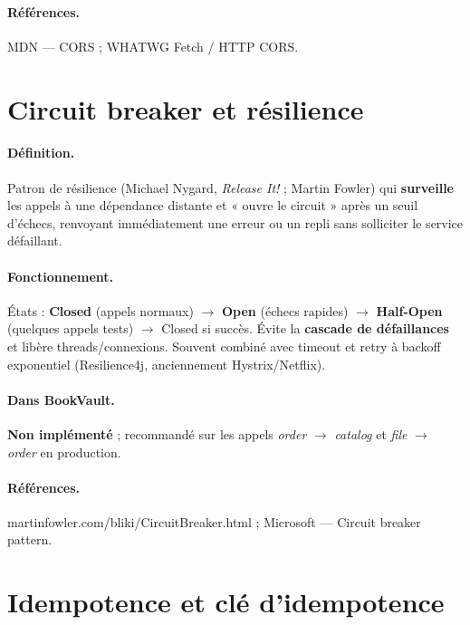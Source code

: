 \documentclass[12pt,a4paper]{report}
\begin{document}
\paragraph{Références.} MDN — CORS ; WHATWG Fetch / HTTP CORS.\par


\section{Circuit breaker et résilience}

\paragraph{Définition.} Patron de résilience (Michael Nygard, \textit{Release It!} ; Martin Fowler) qui \textbf{surveille} les appels à une dépendance distante et « ouvre le circuit » après un seuil d'échecs, renvoyant immédiatement une erreur ou un repli sans solliciter le service défaillant.\par

\paragraph{Fonctionnement.} États : \textbf{Closed} (appels normaux) $\rightarrow$ \textbf{Open} (échecs rapides) $\rightarrow$ \textbf{Half-Open} (quelques appels tests) $\rightarrow$ Closed si succès. Évite la \textbf{cascade de défaillances} et libère threads/connexions. Souvent combiné avec timeout et retry à backoff exponentiel (Resilience4j, anciennement Hystrix/Netflix).\par

\paragraph{Dans BookVault.} \textbf{Non implémenté} ; recommandé sur les appels \textit{order} $\rightarrow$ \textit{catalog} et \textit{file} $\rightarrow$ \textit{order} en production.\par

\paragraph{Références.} martinfowler.com/bliki/CircuitBreaker.html ; Microsoft — Circuit breaker pattern.\par


\section{Idempotence et clé d'idempotence}
\end{document}
